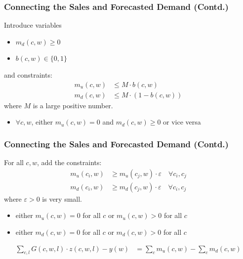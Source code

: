 \documentclass[xcolor=table]{beamer}
\begin{document}
\begin{frame}[t]
\frametitle{Connecting the Sales and Forecasted Demand (Contd.)}
Introduce variables 
  \begin{itemize}
    \item $m_d(c, w) \geq 0$
    \item $b(c, w) \in \{0, 1\}$ 
  \end{itemize}      
and constraints:
\begin{align*}
m_u(c, w) & \leq M \cdot b(c, w) \\
m_d(c, w) & \leq M \cdot (1 - b(c, w)) 
\end{align*}
where $M$ is a large positive number.
\begin{itemize}
    \item $\forall c, w$, either $m_u(c, w) = 0$ and $m_d(c, w) \geq 0$ or
      vice versa
\end{itemize}
\end{frame}


\begin{frame}[t]
\frametitle{Connecting the Sales and Forecasted Demand (Contd.)}
For all $c, w$, add the constraints:
\begin{align*}
  m_u(c_i, w) & \geq m_u(c_j, w) \cdot \varepsilon \quad \forall c_i, c_j \\
  m_d(c_i, w) & \geq m_d(c_j, w) \cdot \varepsilon \quad \forall c_i, c_j
\end{align*}
where $\varepsilon > 0$ is very small.
\begin{itemize}
    \item either $m_u(c, w) = 0$ for all $c$ or $m_u(c, w) > 0$ for all $c$
    \item either $m_d(c, w) = 0$ for all $c$ or $m_d(c, w) > 0$ for all $c$
\end{itemize}

\pause

\begin{align*}
 \sum_{c, l} G(c, w, l) \cdot z(c, w, l) - y(w) & = \sum_{c} m_u(c, w) - \sum_{c} m_d(c, w) 
\end{align*}
\end{frame}
\end{document}
